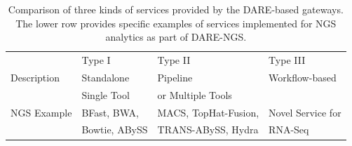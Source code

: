 \documentclass[]{svjour3}
\begin{document}

\begin{table}[!h]
\centering
\begin{tabular}{| l | l | l | l |} \hline \rowcolor[rgb]{0.8,0.8,0.8} &
Type I & Type II & Type III \\ Description & Standalone  & Pipeline & Workflow-based \\ 
& Single Tool  & or Multiple Tools &  \\\hline 
NGS Example & BFast, BWA,  & MACS, TopHat-Fusion,  &   Novel Service for 
 \\
 &  Bowtie, ABySS  & TRANS-ABySS, Hydra & RNA-Seq \\
\hline
\end{tabular}
\caption{Comparison of three kinds of services provided by the
  DARE-based gateways. The lower row provides specific examples of
  services  implemented for NGS analytics as part of DARE-NGS.}
\label{table:three-type-service}
\end{table}


\end{document}
